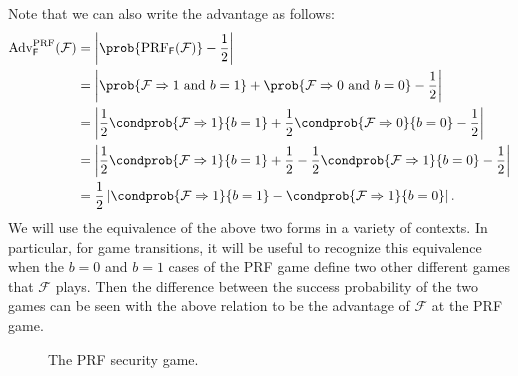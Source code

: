 \iffullversion
Note that we can also write the advantage as follows:
\begin{align*}
\text{Adv}^\mathrm{PRF}_\mathsf{F}(\mathcal{F})&=\left\lvert \prob{\text{PRF}_\mathsf{F}(\mathcal{F})}-\frac{1}{2} \right\rvert \\
&=\left\lvert \prob{\mathcal{F}\Rightarrow 1 \text{ and } b=1} + \prob{\mathcal{F}\Rightarrow 0 \text{ and } b=0} -\frac{1}{2} \right\rvert \\
&=\left\lvert \frac{1}{2}\condprob{\mathcal{F}\Rightarrow 1}{b=1} + \frac{1}{2}\condprob{\mathcal{F}\Rightarrow 0}{b=0} -\frac{1}{2} \right\rvert \\
&=\left\lvert \frac{1}{2}\condprob{\mathcal{F}\Rightarrow 1}{b=1} + \frac{1}{2} - \frac{1}{2}\condprob{\mathcal{F}\Rightarrow 1}{b=0} -\frac{1}{2} \right\rvert \\
&=\frac{1}{2} \left\lvert \condprob{\mathcal{F}\Rightarrow 1}{b=1} - \condprob{\mathcal{F}\Rightarrow 1}{b=0} \right\rvert. \\
\end{align*}
We will use the equivalence of the above two forms in a variety of contexts. In particular, for game transitions, it will be useful to recognize this equivalence when the $b=0$ and $b=1$ cases of the PRF game define two other different games that $\mathcal{F}$ plays. Then the difference between the success probability of the two games can be seen with the above relation to be the advantage of $\mathcal{F}$ at the PRF game.
\fi

\begin{figure}
\centering
\begin{pchstack}
\pchspace
{}
\end{pchstack}
\caption{The PRF security game.}
\label{game:prfgame}
\end{figure}

